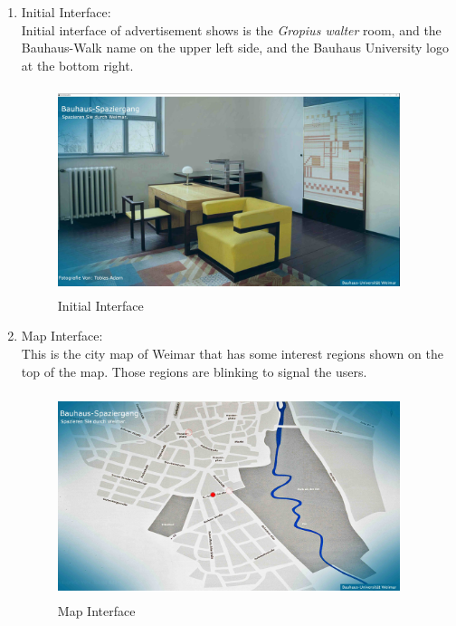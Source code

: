 \begin{enumerate}

\item Initial Interface: \\
Initial interface of advertisement shows is the \emph{Gropius walter} room, and the Bauhaus-Walk name on the upper left side, and the Bauhaus University logo at the bottom right.

\begin{figure}[H]
    \centering
    \includegraphics[width=100mm,height=60mm]{Figures/7/initialpage}
    \caption{Initial Interface}%
    \label{fig:adInitialpage}%
\end{figure}

\item Map Interface: \\
This is the city map of Weimar that has some interest regions shown on the top of the map. Those regions are blinking to signal the users.

\begin{figure}[H]
    \centering
    \includegraphics[width=100mm,height=60mm]{Figures/7/map}
    \caption{Map Interface}%
    \label{fig:adSecondpage1}%
\end{figure}


\end{enumerate}
